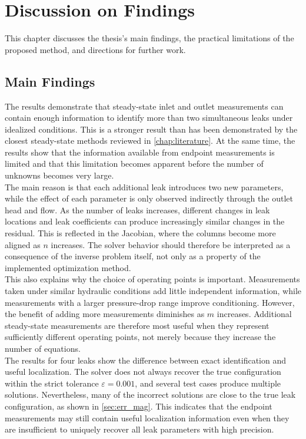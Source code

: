 \chapter{Discussion on Findings}
\label{chap:discussion}

This chapter discusses the thesis's main findings, the practical limitations of the proposed method, and directions for further work.

\section{Main Findings}

The results demonstrate that steady-state inlet and outlet measurements can contain enough information to identify more than two simultaneous leaks under idealized conditions. This is a stronger result than has been demonstrated by the closest steady-state methods reviewed in \autoref{chap:literature}. At the same time, the results show that the information available from endpoint measurements is limited and that this limitation becomes apparent before the number of unknowns becomes very large.\\

The main reason is that each additional leak introduces two new parameters, while the effect of each parameter is only observed indirectly through the outlet head and flow. As the number of leaks increases, different changes in leak locations and leak coefficients can produce increasingly similar changes in the residual. This is reflected in the Jacobian, where the columns become more aligned as $n$ increases. The solver behavior should therefore be interpreted as a consequence of the inverse problem itself, not only as a property of the implemented optimization method.\\

This also explains why the choice of operating points is important. Measurements taken under similar hydraulic conditions add little independent information, while measurements with a larger pressure-drop range improve conditioning. However, the benefit of adding more measurements diminishes as $m$ increases. Additional steady-state measurements are therefore most useful when they represent sufficiently different operating points, not merely because they increase the number of equations.\\

The results for four leaks show the difference between exact identification and useful localization. The solver does not always recover the true configuration within the strict tolerance $\varepsilon=0.001$, and several test cases produce multiple solutions. Nevertheless, many of the incorrect solutions are close to the true leak configuration, as shown in \autoref{sec:err_mag}. This indicates that the endpoint measurements may still contain useful localization information even when they are insufficient to uniquely recover all leak parameters with high precision.\\

